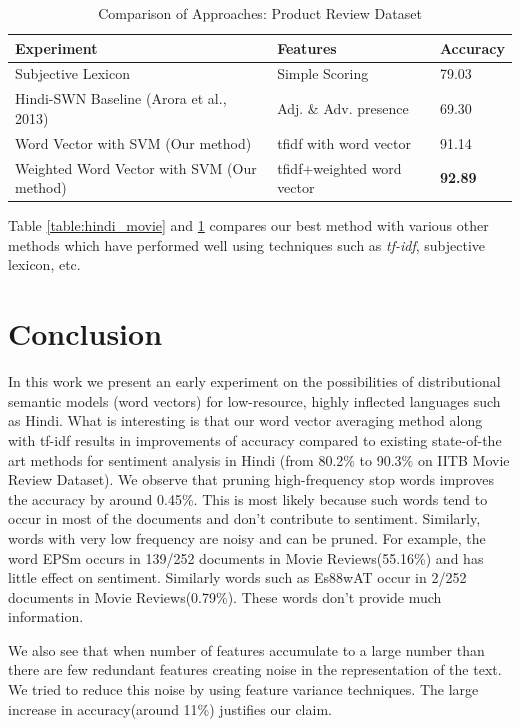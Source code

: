 \documentclass[11pt,a4paper]{article}
\begin{document}
\begin {table}[H]
\centering
\small
\begin{tabular}{ | p{3.5cm} | p{1.8cm} | p{1.2cm} | }
\hline
\textbf{Experiment} & \textbf{Features} & \textbf{Accuracy} \\ \hline
Subjective Lexicon~\cite{Bakliwal:12} & Simple Scoring & 79.03\\ \hline
Hindi-SWN Baseline (Arora et al., 2013) & Adj. \& Adv. presence & 69.30\\ \hline
Word Vector with SVM (Our method) & tfidf with word vector & 91.14\\ \hline
Weighted Word Vector with SVM (Our method) & tfidf+weighted word vector & \textbf{92.89}\\ \hline
\end{tabular}
\caption {Comparison of Approaches: Product Review Dataset}
\label{table:hindi_product}
\end{table}
Table \ref{table:hindi_movie} and \ref{table:hindi_product} compares our best method with various other methods which have performed well using techniques such as \emph{tf-idf}, subjective lexicon, etc.

\section{Conclusion}
\label{sec:conclusion}
In this work we present an early experiment on the possibilities of distributional semantic models (word vectors) for low-resource, highly inflected languages such as Hindi.  What is interesting is that our word vector averaging method along with tf-idf results in improvements of accuracy compared to existing state-of-the art methods for sentiment analysis in Hindi (from 80.2\% to 90.3\% on IITB Movie Review Dataset).
We observe that pruning high-frequency stop words improves the accuracy by around 0.45\%. This is most likely  because such words tend to occur in most of the documents and don't contribute to sentiment. Similarly, words with very low frequency are noisy and can be pruned. For example, the word {\dn EPSm} occurs in 139/252 documents in Movie Reviews(55.16\%) and has little effect on sentiment. Similarly words such as {\dn Es\388wAT\0} occur in 2/252 documents in Movie Reviews(0.79\%). These words don't provide much information.

We also see that when number of features accumulate to a large number than there are few redundant features creating noise in the representation of the text. We tried to reduce this noise by using feature variance techniques. The large increase in accuracy(around 11\%) justifies our claim.
\end{document}

